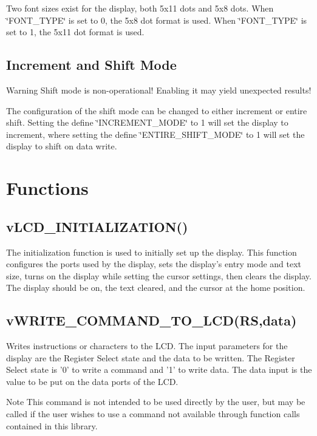 Two font sizes exist for the display, both 5x11 dots and 5x8 dots. When \char`\"{}\-F\-O\-N\-T\-\_\-\-T\-Y\-P\-E\char`\"{} is set to 0, the 5x8 dot format is used. When \char`\"{}\-F\-O\-N\-T\-\_\-\-T\-Y\-P\-E\char`\"{} is set to 1, the 5x11 dot format is used.\hypertarget{_usage_Mode}{}\subsection{Increment and Shift Mode}\label{_usage_Mode}
\begin{DoxyWarning}{Warning}
Shift mode is non-\/operational! Enabling it may yield unexpected results!
\end{DoxyWarning}
The configuration of the shift mode can be changed to either increment or entire shift. Setting the define \char`\"{}\-I\-N\-C\-R\-E\-M\-E\-N\-T\-\_\-\-M\-O\-D\-E\char`\"{} to 1 will set the display to increment, where setting the define \char`\"{}\-E\-N\-T\-I\-R\-E\-\_\-\-S\-H\-I\-F\-T\-\_\-\-M\-O\-D\-E\char`\"{} to 1 will set the display to shift on data write.\hypertarget{_usage_functions}{}\section{Functions}\label{_usage_functions}
\hypertarget{_usage_Initialization}{}\subsection{v\-L\-C\-D\-\_\-\-I\-N\-I\-T\-I\-A\-L\-I\-Z\-A\-T\-I\-O\-N()}\label{_usage_Initialization}
The initialization function is used to initially set up the display. This function configures the ports used by the display, sets the display's entry mode and text size, turns on the display while setting the cursor settings, then clears the display. The display should be on, the text cleared, and the cursor at the home position.\hypertarget{_usage_write_command}{}\subsection{v\-W\-R\-I\-T\-E\-\_\-\-C\-O\-M\-M\-A\-N\-D\-\_\-\-T\-O\-\_\-\-L\-C\-D(\-R\-S,data)}\label{_usage_write_command}
Writes instructions or characters to the L\-C\-D. The input parameters for the display are the Register Select state and the data to be written. The Register Select state is '0' to write a command and '1' to write data. The data input is the value to be put on the data ports of the L\-C\-D. \begin{DoxyNote}{Note}
This command is not intended to be used directly by the user, but may be called if the user wishes to use a command not available through function calls contained in this library.
\end{DoxyNote}
